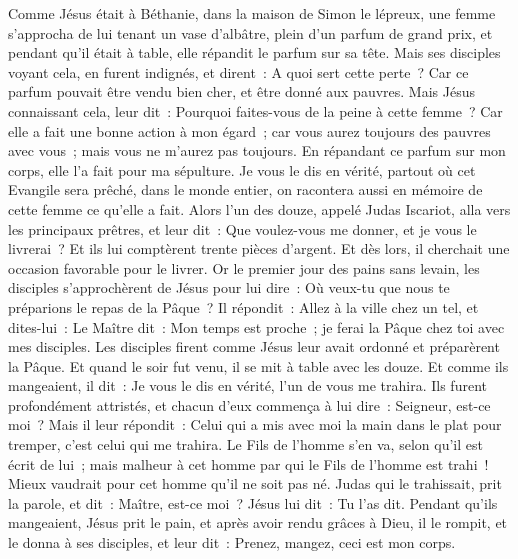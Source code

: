 \begin{multicols}{2}
Comme Jésus était à Béthanie, dans la maison de Simon le lépreux,
une femme s'approcha de lui tenant un vase d'albâtre, plein d'un parfum de grand prix, et pendant qu'il était à table, elle répandit le parfum sur sa tête.
Mais ses disciples voyant cela, en furent indignés, et dirent~: A quoi sert cette perte~?
Car ce parfum pouvait être vendu bien cher, et être donné aux pauvres.
Mais Jésus connaissant cela, leur dit~: Pourquoi faites-vous de la peine à cette femme~? Car elle a fait une bonne action à mon égard~;
car vous aurez toujours des pauvres avec vous~; mais vous ne m'aurez pas toujours.
En répandant ce parfum sur mon corps, elle l'a fait pour ma sépulture.
Je vous le dis en vérité, partout où cet Evangile sera prêché, dans le monde entier, on racontera aussi en mémoire de cette femme ce qu'elle a fait.
Alors l'un des douze, appelé Judas Iscariot, alla vers les principaux prêtres,
et leur dit~: Que voulez-vous me donner, et je vous le livrerai~? Et ils lui comptèrent trente pièces d'argent.
Et dès lors, il cherchait une occasion favorable pour le livrer.
Or le premier jour des pains sans levain, les disciples s'approchèrent de Jésus pour lui dire~: Où veux-tu que nous te préparions le repas de la Pâque~?
Il répondit~: Allez à la ville chez un tel, et dites-lui~: Le Maître dit~: Mon temps est proche~; je ferai la Pâque chez toi avec mes disciples.
Les disciples firent comme Jésus leur avait ordonné et préparèrent la Pâque.
Et quand le soir fut venu, il se mit à table avec les douze.
Et comme ils mangeaient, il dit~: Je vous le dis en vérité, l'un de vous me trahira.
Ils furent profondément attristés, et chacun d'eux commença à lui dire~: Seigneur, est-ce moi~?
Mais il leur répondit~: Celui qui a mis avec moi la main dans le plat pour tremper, c'est celui qui me trahira.
Le Fils de l'homme s'en va, selon qu'il est écrit de lui~; mais malheur à cet homme par qui le Fils de l'homme est trahi~! Mieux vaudrait pour cet homme qu'il ne soit pas né.
Judas qui le trahissait, prit la parole, et dit~: Maître, est-ce moi~? Jésus lui dit~: Tu l'as dit.
Pendant qu'ils mangeaient, Jésus prit le pain, et après avoir rendu grâces à Dieu, il le rompit, et le donna à ses disciples, et leur dit~: Prenez, mangez, ceci est mon corps.

\end{multicols}
